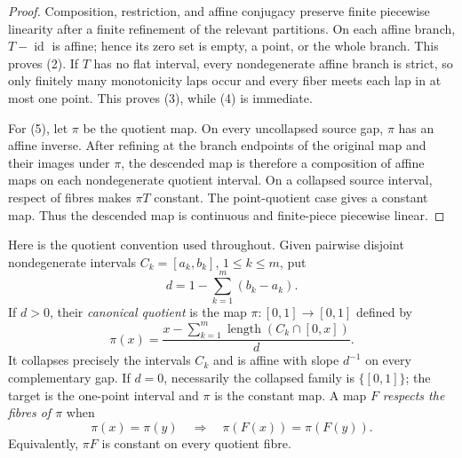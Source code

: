 \documentclass[11pt]{article}
\theoremstyle{definition}
\theoremstyle{remark}
\newcommand{\I}{[0,1]}
\newcommand{\id}{\operatorname{id}}
\begin{document}
\begin{proof}
Composition, restriction, and affine conjugacy preserve finite piecewise
linearity after a finite refinement of the relevant partitions.  On each
affine branch, $T-\id$ is affine; hence its zero set is empty, a point, or
the whole branch.  This proves (2).  If $T$ has no flat interval, every
nondegenerate affine branch is strict, so only finitely many monotonicity
laps occur and every fiber meets each lap in at most one point.  This proves
(3), while (4) is immediate.

For (5), let $\pi$ be the quotient map.  On every uncollapsed source gap,
$\pi$ has an affine inverse.  After refining at the branch endpoints of the
original map and their images under $\pi$, the descended map is therefore a
composition of affine maps on each nondegenerate quotient interval.  On a
collapsed source interval, respect of fibres makes $\pi T$ constant.  The
point-quotient case gives a constant map.  Thus the descended map is
continuous and finite-piece piecewise linear.
\end{proof}

Here is the quotient convention used throughout.  Given pairwise disjoint
nondegenerate intervals $C_k=[a_k,b_k]$, $1\leq k\leq m$, put
\[
 d=1-\sum_{k=1}^m(b_k-a_k).
\]
If $d>0$, their \emph{canonical quotient} is the map $\pi:\I\to\I$ defined
by
\begin{equation}\label{eq:canonical-quotient}
 \pi(x)=\frac{x-\sum_{k=1}^m
              \operatorname{length}(C_k\cap[0,x])}{d}.
\end{equation}
It collapses precisely the intervals $C_k$ and is affine with slope $d^{-1}$
on every complementary gap.  If $d=0$, necessarily the collapsed family is
$\{\I\}$; the target is the one-point interval and $\pi$ is the constant
map.  A map $F$ \emph{respects the fibres of $\pi$} when
\begin{equation}\label{eq:respect-fibres}
 \pi(x)=\pi(y)\quad\Longrightarrow\quad
 \pi(F(x))=\pi(F(y)).
\end{equation}
Equivalently, $\pi F$ is constant on every quotient fibre.
\end{document}
